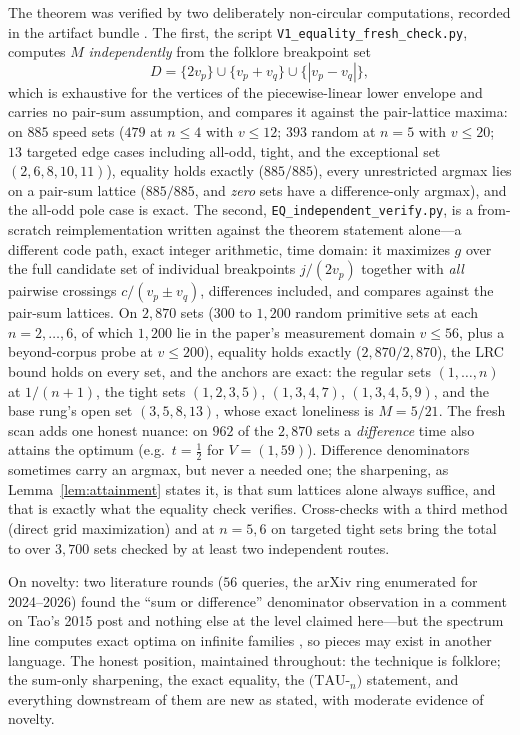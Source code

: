 The theorem was verified by two deliberately non-circular computations,
recorded in the artifact bundle \cite{prog-artifacts}. The first, the
script \texttt{V1\_equality\_fresh\_check.py}, computes $M$
\emph{independently} from the folklore breakpoint set
\[
D=\{2v_p\}\cup\{v_p+v_q\}\cup\{|v_p-v_q|\},
\]
which is exhaustive for the vertices of the piecewise-linear lower
envelope and carries no pair-sum assumption, and compares it against the
pair-lattice maxima: on $885$ speed sets ($479$ at $n\le 4$ with
$v\le 12$; $393$ random at $n=5$ with $v\le 20$; $13$ targeted edge
cases including all-odd, tight, and the exceptional set
$(2,6,8,10,11)$), equality holds exactly ($885/885$), every unrestricted
argmax lies on a pair-sum lattice ($885/885$, and \emph{zero} sets have
a difference-only argmax), and the all-odd pole case is exact. The
second, \texttt{EQ\_independent\_verify.py}, is a from-scratch
reimplementation written against the theorem statement alone---a
different code path, exact integer arithmetic, time domain: it maximizes
$g$ over the full candidate set of individual breakpoints $j/(2v_p)$
together with \emph{all} pairwise crossings $c/(v_p\pm v_q)$, differences
included, and compares against the pair-sum lattices. On $2{,}870$ sets
($300$ to $1{,}200$ random primitive sets at each $n=2,\dots,6$, of which
$1{,}200$ lie in the paper's measurement domain $v\le 56$, plus a
beyond-corpus probe at $v\le 200$), equality holds exactly
($2{,}870/2{,}870$), the LRC bound holds on every set, and the anchors
are exact: the regular sets $(1,\dots,n)$ at $1/(n{+}1)$, the tight sets
$(1,2,3,5)$, $(1,3,4,7)$, $(1,3,4,5,9)$, and the base rung's open set
$(3,5,8,13)$, whose exact loneliness is $M=5/21$. The fresh scan adds
one honest nuance: on $962$ of the $2{,}870$ sets a \emph{difference}
time also attains the optimum (e.g.\ $t=\tfrac12$ for $V=(1,59)$).
Difference denominators sometimes carry an argmax, but never a needed
one; the sharpening, as Lemma~\ref{lem:attainment} states it, is that
sum lattices alone always suffice, and that is exactly what the
equality check verifies. Cross-checks with a third method (direct grid
maximization) and at $n=5,6$ on targeted tight sets bring the total to
over $3{,}700$ sets checked by at least two independent routes.

On novelty: two literature rounds ($56$ queries, the arXiv ring
enumerated for 2024--2026) found the ``sum or difference'' denominator
observation in a comment on Tao's 2015 post \cite{Tao-blog} and nothing
else at the level claimed here---but the spectrum line computes exact
optima on infinite families \cite{Cordella}, so pieces may exist in
another language. The honest position, maintained throughout: the
technique is folklore; the sum-only sharpening, the exact equality, the
$(\mathrm{TAU}$-$_n)$ statement, and everything downstream of them are
new as stated, with moderate evidence of novelty.
